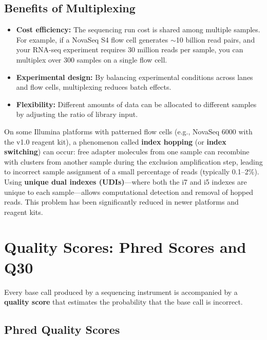 \subsection{Benefits of Multiplexing}
\label{subsec:seqprinciples:multiplexing-benefits}

\begin{itemize}[itemsep=2pt]
  \item \textbf{Cost efficiency:} The sequencing run cost is shared among multiple samples. For example, if a NovaSeq S4 flow cell generates $\sim$10 billion read pairs, and your RNA-seq experiment requires 30 million reads per sample, you can multiplex over 300 samples on a single flow cell.
  \item \textbf{Experimental design:} By balancing experimental conditions across lanes and flow cells, multiplexing reduces batch effects.
  \item \textbf{Flexibility:} Different amounts of data can be allocated to different samples by adjusting the ratio of library input.
\end{itemize}

\begin{warningbox}[title={Index Hopping}]
On some Illumina platforms with patterned flow cells (e.g., NovaSeq 6000 with the v1.0 reagent kit), a phenomenon called \textbf{index hopping} (or \textbf{index switching}) can occur: free adapter molecules from one sample can recombine with clusters from another sample during the exclusion amplification step, leading to incorrect sample assignment of a small percentage of reads (typically 0.1--2\%). Using \textbf{unique dual indexes (UDIs)}---where both the i7 and i5 indexes are unique to each sample---allows computational detection and removal of hopped reads. This problem has been significantly reduced in newer platforms and reagent kits.
\end{warningbox}


\section{Quality Scores: Phred Scores and Q30}
\label{sec:seqprinciples:quality-scores}

Every base call produced by a sequencing instrument is accompanied by a \textbf{quality score} that estimates the probability that the base call is incorrect.

\subsection{Phred Quality Scores}
\label{subsec:seqprinciples:phred}

